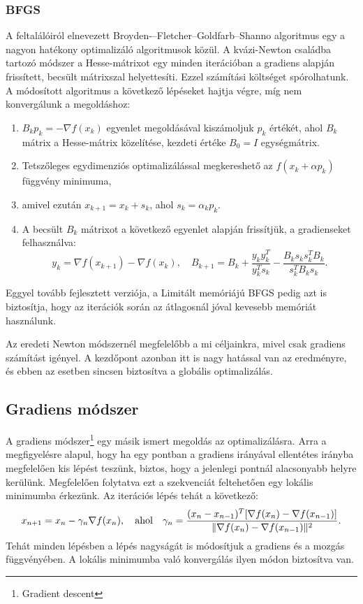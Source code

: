 \subsubsection{BFGS}
A feltalálóiról elnevezett Broyden-–Fletcher--Goldfarb--Shanno algoritmus egy a nagyon hatékony optimalizáló algoritmusok közül. A kvázi-Newton családba tartozó módszer a Hesse-mátrixot egy minden iterációban a gradiens alapján frissített, becsült mátrixszal helyettesíti. Ezzel számítási költséget spórolhatunk. A módosított algoritmus a következő lépéseket hajtja végre, míg nem konvergálunk a megoldáshoz:
\begin{enumerate}
	\item $B_kp_k=-\nabla f(x_k)$ egyenlet megoldásával kiszámoljuk $p_k$ értékét, ahol $B_k$ mátrix a Hesse-mátrix közelítése, kezdeti értéke $B_0=I$ egységmátrix.
	\item Tetszőleges egydimenziós optimalizálással megkereshető az $f(x_k+\alpha p_k)$ függvény minimuma,
	\item amivel ezután $x_{k+1}=x_k+s_k$, ahol $s_k=\alpha _kp_k$.
	\item A becsült $B_k$ mátrixot a következő egyenlet alapján frissítjük, a gradienseket felhasználva:
	$$y_k=\nabla f(x_{k+1})-\nabla f(x_k), \quad B_{k+1}=B_k+\frac{y_ky_k^T}{y_k^Ts_k}-\frac{B_ks_ks_k^TB_k}{s_k^TB_ks_k}.$$
\end{enumerate}

Eggyel tovább fejlesztett verziója, a Limitált memóriájú BFGS pedig azt is biztosítja, hogy az iterációk során az átlagosnál jóval kevesebb memóriát használunk.

Az eredeti Newton módszernél megfelelőbb a mi céljainkra, mivel csak gradiens számítást igényel. A kezdőpont azonban itt is nagy hatással van az eredményre, és ebben az esetben sincsen biztosítva a globális optimalizálás.

\subsection{Gradiens módszer}

A gradiens módszer\footnote{Gradient descent} egy másik ismert megoldás az optimalizálásra. Arra a megfigyelésre alapul, hogy ha egy pontban a gradiens irányával ellentétes irányba megfelelően kis lépést teszünk, biztos, hogy a jelenlegi pontnál alacsonyabb helyre kerülünk. Megfelelően folytatva ezt a szekvenciát feltehetően egy lokális minimumba érkezünk. Az iterációs lépés tehát a következő:
\begin{equation}
	\label{eq:gd}
	x_{n+1}=x_n-\gamma _n\nabla f(x_n),\quad \textnormal{ahol}\quad \gamma _n=\frac{(x_n-x_{n-1})^T[\nabla f(x_n)-\nabla f(x_{n-1})]}{\|\nabla f(x_n)-\nabla f(x_{n-1})\|^2}.
\end{equation}
Tehát minden lépésben a lépés nagyságát is módosítjuk a gradiens és a mozgás függvényében. A lokális minimumba való konvergálás ilyen módon biztosítva van. 

